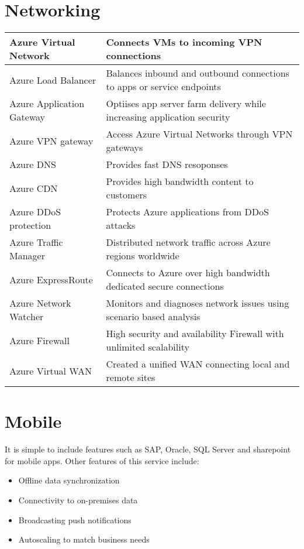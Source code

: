 \documentclass{article}[18pt]
\begin{document}
\section{Networking}
{\renewcommand{\arraystretch}{2}
	\begin{tabularx}{\textwidth}{X X}
		
		Azure Virtual Network& Connects VMs to incoming VPN connections\\
		\hline
		Azure Load Balancer& Balances inbound and outbound connections to apps or service endpoints\\
		\hline
		Azure Application Gateway&Optiises app server farm delivery while increasing application security\\
		\hline
		Azure VPN gateway& Access Azure Virtual Networks through VPN gateways\\
		\hline
		Azure DNS& Provides fast DNS resoponses\\
		\hline
		Azure CDN&Provides high bandwidth content to customers\\
		\hline
		Azure DDoS protection& Protects Azure applications from DDoS attacks\\
		\hline
		Azure Traffic Manager& Distributed network traffic across Azure regions worldwide\\
		\hline
		Azure ExpressRoute& Connects to Azure over high bandwidth dedicated secure connections\\
		\hline
		Azure Network Watcher& Monitors and diagnoses network issues using scenario based analysis\\
		\hline
		Azure Firewall& High security and availability Firewall with unlimited scalability\\
		\hline
		Azure Virtual WAN& Created a unified WAN connecting local and remote sites
		
		
	\end{tabularx}
}
\section{Mobile}
It is simple to include features such as SAP, Oracle, SQL Server and sharepoint for mobile apps. Other features of this service include:
\begin{itemize}
	\item Offline data synchronization
	\item Connectivity to on-premises data
	\item Broadcasting push notifications
	\item Autoscaling to match business needs
\end{itemize}
\end{document}
